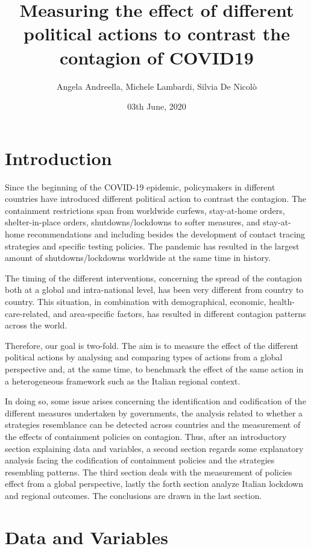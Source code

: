 \documentclass[
  6pt,
]{article}
\title{Measuring the effect of different political actions to contrast
the contagion of COVID19}
\subtitle{Angela Andreella, Michele Lambardi, Silvia De Nicolò}
\author{}
\date{\vspace{-2.5em}03th June, 2020}
\begin{document}
\maketitle

{
\setcounter{tocdepth}{2}
\tableofcontents
}
\hypertarget{introduction}{%
\section{Introduction}\label{introduction}}

Since the beginning of the COVID-19 epidemic, policymakers in different
countries have introduced different political action to contrast the
contagion. The containment restrictions span from worldwide curfews,
stay-at-home orders, shelter-in-place orders, shutdowns/lockdowns to
softer measures, and stay-at-home recommendations and including besides
the development of contact tracing strategies and specific testing
policies. The pandemic has resulted in the largest amount of
shutdowns/lockdowns worldwide at the same time in history.

The timing of the different interventions, concerning the spread of the
contagion both at a global and intra-national level, has been very
different from country to country. This situation, in combination with
demographical, economic, health-care-related, and area-specific factors,
has resulted in different contagion patterns across the world.

Therefore, our goal is two-fold. The aim is to measure the effect of the
different political actions by analysing and comparing types of actions
from a global perspective and, at the same time, to benchmark the effect
of the same action in a heterogeneous framework such as the Italian
regional context.

In doing so, some issue arises concerning the identification and
codification of the different measures undertaken by governments, the
analysis related to whether a strategies resemblance can be detected
across countries and the measurement of the effects of containment
policies on contagion. Thus, after an introductory section explaining
data and variables, a second section regards some explanatory analysis
facing the codification of containment policies and the strategies
resembling patterns. The third section deals with the measurement of
policies effect from a global perspective, lastly the forth section
analyze Italian lockdown and regional outcomes. The conclusions are
drawn in the last section.

\hypertarget{data-and-variables}{%
\section{Data and Variables}\label{data-and-variables}}
\end{document}
